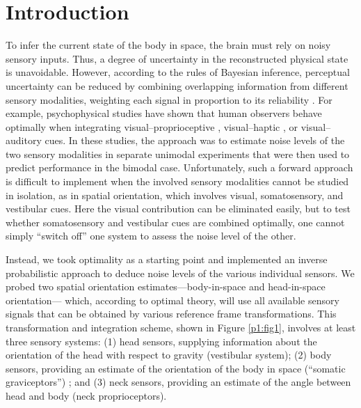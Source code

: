 \section{Introduction}

To infer the current state of the body in space, the brain must rely on noisy sensory inputs. Thus, a degree of uncertainty in the reconstructed physical state is unavoidable. However, according to the rules of Bayesian inference, perceptual uncertainty can be reduced by combining overlapping information from different sensory modalities, weighting each signal in proportion to its reliability \cite{knill2004,kording2004,angelaki2008}. For example, psychophysical studies have shown that human observers behave optimally when integrating visual--proprioceptive \cite{vanbeers1999}, visual--haptic \cite{ernst2002}, or visual--auditory \cite{alais2004} cues. In these studies, the approach was to estimate noise levels of the two sensory modalities in separate unimodal experiments that were then used to predict performance in the bimodal case. Unfortunately, such a forward approach is difficult to implement when the involved sensory modalities cannot be studied in isolation, as in spatial orientation, which involves visual, somatosensory, and vestibular cues. Here the visual contribution can be eliminated easily, but to test whether somatosensory and vestibular cues are combined optimally, one cannot simply ``switch off'' one system to assess the noise level of the other. 

Instead, we took optimality as a starting point and implemented an inverse probabilistic approach to deduce noise levels of the various individual sensors. We probed two spatial orientation estimates---body-in-space and head-in-space orientation--- which, according to optimal theory, will use all available sensory signals that can be obtained by various reference frame transformations. This transformation and integration scheme, shown in Figure \ref{p1:fig1}, involves at least three sensory systems: (1) head sensors, supplying information about the orientation of the head with respect to gravity (vestibular system); (2) body sensors, providing an estimate of the orientation of the body in space (``somatic graviceptors'') \cite{mittelstaedt1997}; and (3) neck sensors, providing an estimate of the angle between head and body (neck proprioceptors). 

